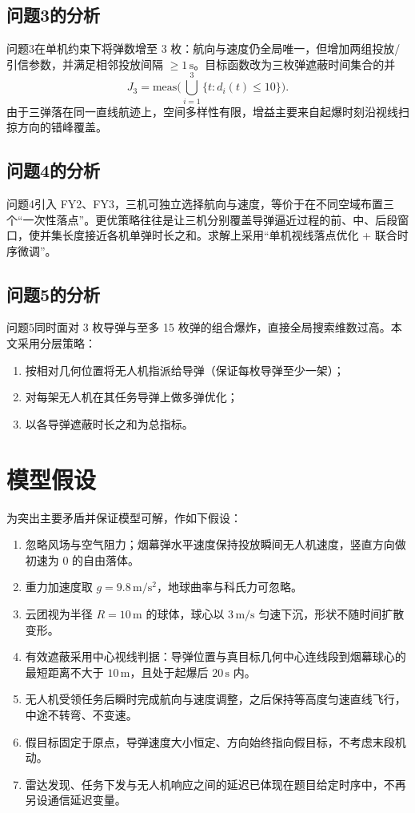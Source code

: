 \documentclass[withoutpreface,bwprint]{cumcmthesis}
\begin{document}
\subsection{问题3的分析}
问题3在单机约束下将弹数增至 3 枚：航向与速度仍全局唯一，但增加两组投放/引信参数，并满足相邻投放间隔 $\ge 1\,\mathrm{s}$。目标函数改为三枚弹遮蔽时间集合的并
\[
J_3=\mathrm{meas}\Big(\bigcup_{i=1}^{3}\{t:d_i(t)\le 10\}\Big).
\]
由于三弹落在同一直线航迹上，空间多样性有限，增益主要来自起爆时刻沿视线扫掠方向的错峰覆盖。

\subsection{问题4的分析}
问题4引入 FY2、FY3，三机可独立选择航向与速度，等价于在不同空域布置三个“一次性落点”。更优策略往往是让三机分别覆盖导弹逼近过程的前、中、后段窗口，使并集长度接近各机单弹时长之和。求解上采用“单机视线落点优化 + 联合时序微调”。

\subsection{问题5的分析}
问题5同时面对 3 枚导弹与至多 15 枚弹的组合爆炸，直接全局搜索维数过高。本文采用分层策略：
\begin{enumerate}
  \item 按相对几何位置将无人机指派给导弹（保证每枚导弹至少一架）；
  \item 对每架无人机在其任务导弹上做多弹优化；
  \item 以各导弹遮蔽时长之和为总指标。
\end{enumerate}

\section{模型假设}

为突出主要矛盾并保证模型可解，作如下假设：
\begin{enumerate}
  \item 忽略风场与空气阻力；烟幕弹水平速度保持投放瞬间无人机速度，竖直方向做初速为 0 的自由落体。
  \item 重力加速度取 $g=9.8\,\mathrm{m/s^2}$，地球曲率与科氏力可忽略。
  \item 云团视为半径 $R=10\,\mathrm{m}$ 的球体，球心以 $3\,\mathrm{m/s}$ 匀速下沉，形状不随时间扩散变形。
  \item 有效遮蔽采用中心视线判据：导弹位置与真目标几何中心连线段到烟幕球心的最短距离不大于 $10\,\mathrm{m}$，且处于起爆后 $20\,\mathrm{s}$ 内。
  \item 无人机受领任务后瞬时完成航向与速度调整，之后保持等高度匀速直线飞行，中途不转弯、不变速。
  \item 假目标固定于原点，导弹速度大小恒定、方向始终指向假目标，不考虑末段机动。
  \item 雷达发现、任务下发与无人机响应之间的延迟已体现在题目给定时序中，不再另设通信延迟变量。
\end{enumerate}
\end{document}
